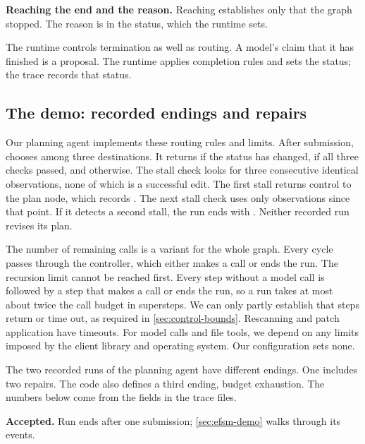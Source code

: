 \item \textbf{Reaching the end and the reason.} Reaching  establishes only that the
graph stopped. The reason is in the status, which the runtime sets.

\ei

The runtime controls termination as well as routing. A model's claim that it has finished is a
proposal. The runtime applies completion rules and sets the status; the trace records that status.

\subsection{The demo: recorded endings and repairs}
\label{sec:control-demo}

Our planning agent implements these routing rules and limits. After submission,
 chooses among three destinations. It returns  if the status
has changed,  if all three checks passed, and  otherwise.
The stall check looks for three consecutive identical observations, none of which is a
successful edit. The first stall returns control to the plan node, which records
. The next stall check uses only observations since that point. If it
detects a second stall, the run ends with . Neither recorded run revises
its plan.

The number of remaining calls is a variant for the whole graph. Every cycle passes through the
controller, which either makes a call or ends the run. The recursion limit cannot be reached
first. Every step without a model call is followed by a step that makes a call or ends the run,
so a run takes at most about twice the call budget in supersteps. We can only partly establish
that steps return or time out, as required in \cref{sec:control-bounds}. Rescanning and patch
application have timeouts. For model calls and file tools, we depend on any limits imposed by
the client library and operating system. Our configuration sets none.

The two recorded runs of the planning agent have different endings. One includes two repairs.
The code also defines a third ending, budget exhaustion. The numbers below come from the
 fields in the trace files.

\bi

\item \textbf{Accepted.} Run  ends  after one submission;
\cref{sec:efsm-demo} walks through its events.

